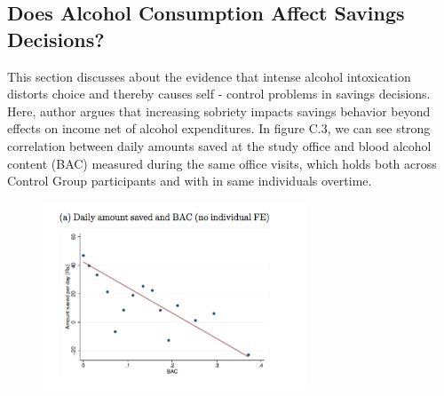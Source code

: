 \documentclass[a4paper,12pt]{article}
\begin{document}
\subsection{Does Alcohol Consumption Affect Savings Decisions?}
This section discusses about the evidence that intense alcohol intoxication distorts choice and thereby causes self - control problems in savings decisions. Here, author argues that increasing sobriety impacts savings behavior beyond effects on income net of alcohol expenditures. In figure C.3, we can see strong correlation between daily amounts saved at the study office and blood alcohol content (BAC) measured during the same office visits, which holds both across Control Group participants and with in same individuals overtime. 

\begin{figure}[h]
\centering
\includegraphics[width=0.7\textwidth]{FigureC3.png}
\caption{\label{fig:FigureC3}}
\end{figure}
\end{document}
